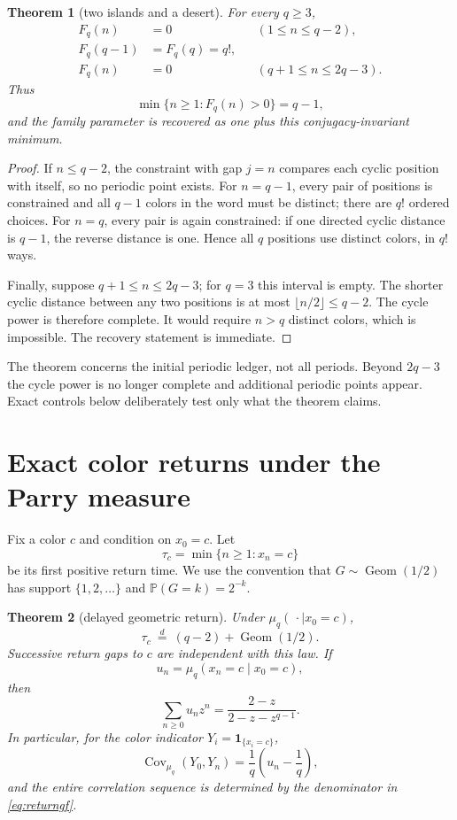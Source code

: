 \documentclass[11pt,a4paper]{amsart}
\newtheorem{theorem}{Theorem}[section]
\theoremstyle{definition}
\theoremstyle{remark}
\newcommand{\Prob}{\mathbb P}
\begin{document}
\begin{theorem}[two islands and a desert]\label{thm:desert}
For every $q\geq3$,
\begin{align*}
 F_q(n)&=0 &&(1\leq n\leq q-2),\\
 F_q(q-1)&=F_q(q)=q!,\\
 F_q(n)&=0 &&(q+1\leq n\leq2q-3).
\end{align*}
Thus
\[
 \min\{n\geq1:F_q(n)>0\}=q-1,
\]
and the family parameter is recovered as one plus this conjugacy-invariant
minimum.
\end{theorem}

\begin{proof}
If $n\leq q-2$, the constraint with gap $j=n$ compares each cyclic position
with itself, so no periodic point exists.  For $n=q-1$, every pair of
positions is constrained and all $q-1$ colors in the word must be distinct;
there are $q!$ ordered choices.  For $n=q$, every pair is again constrained:
if one directed cyclic distance is $q-1$, the reverse distance is one.
Hence all $q$ positions use distinct colors, in $q!$ ways.

Finally, suppose $q+1\leq n\leq2q-3$; for $q=3$ this interval is empty.  The shorter cyclic distance between
any two positions is at most $\lfloor n/2\rfloor\leq q-2$.  The cycle power
is therefore complete.  It would require $n>q$ distinct colors, which is
impossible.  The recovery statement is immediate.
\end{proof}

The theorem concerns the initial periodic ledger, not all periods.  Beyond
$2q-3$ the cycle power is no longer complete and additional periodic points
appear.  Exact controls below deliberately test only what the theorem claims.

\section{Exact color returns under the Parry measure}

Fix a color $c$ and condition on $x_0=c$.  Let
\[
 \tau_c=\min\{n\geq1:x_n=c\}
\]
be its first positive return time.  We use the convention that
$G\sim\operatorname{Geom}(1/2)$ has support $\{1,2,\ldots\}$ and
$\Prob(G=k)=2^{-k}$.

\begin{theorem}[delayed geometric return]\label{thm:return}
Under $\mu_q(\,\cdot\mid x_0=c)$,
\[
 \tau_c\ \stackrel{d}=\ (q-2)+\operatorname{Geom}(1/2).
\]
Successive return gaps to $c$ are independent with this law.  If
\[
 u_n=\mu_q(x_n=c\mid x_0=c),
\]
then
\begin{equation}\label{eq:returngf}
 \sum_{n\geq0}u_nz^n=\frac{2-z}{2-z-z^{q-1}}.
\end{equation}
In particular, for the color indicator $Y_i=\mathbf1_{\{x_i=c\}}$,
\[
 \operatorname{Cov}_{\mu_q}(Y_0,Y_n)
 =\frac1q\left(u_n-\frac1q\right),
\]
and the entire correlation sequence is determined by the denominator in
\eqref{eq:returngf}.
\end{theorem}
\end{document}
